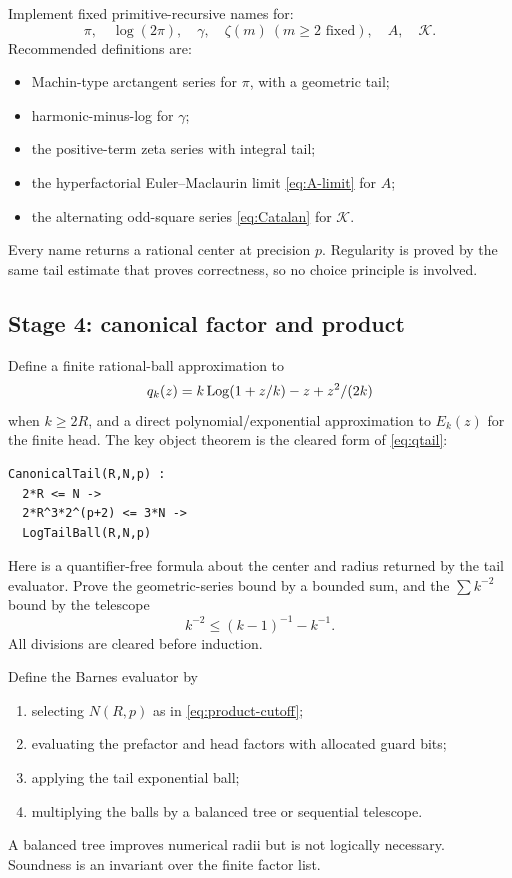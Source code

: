 Implement fixed primitive-recursive names for:
\[
 \pi,\quad \log(2\pi),\quad \gamma,\quad
 \zeta(m)\ (m\ge2\text{ fixed}),\quad
 A,\quad \mathcal K.
\]
Recommended definitions are:
\begin{itemize}
\item Machin-type arctangent series for \(\pi\), with a geometric tail;
\item harmonic-minus-log for \(\gamma\);
\item the positive-term zeta series with integral tail;
\item the hyperfactorial Euler--Maclaurin limit \cref{eq:A-limit} for \(A\);
\item the alternating odd-square series \cref{eq:Catalan} for \(\mathcal K\).
\end{itemize}
Every name returns a rational center at precision \(p\).  Regularity is proved
by the same tail estimate that proves correctness, so no choice principle is
involved.

\subsection{Stage 4: canonical factor and product}

Define a finite rational-ball approximation to
\[
 q_k(z)=k\operatorname{Log}(1+z/k)-z+z^2/(2k)
\]
when \(k\ge2R\), and a direct polynomial/exponential approximation to
\(E_k(z)\) for the finite head.  The key object theorem is the cleared form of
\cref{eq:qtail}:
\begin{lstlisting}[language={}]
CanonicalTail(R,N,p) :
  2*R <= N ->
  2*R^3*2^(p+2) <= 3*N ->
  LogTailBall(R,N,p)
\end{lstlisting}
Here  is a quantifier-free formula about the center and radius
returned by the tail evaluator.  Prove the geometric-series bound by a bounded
sum, and the \(\sum k^{-2}\) bound by the telescope
\[
 k^{-2}\le(k-1)^{-1}-k^{-1}.
\]
All divisions are cleared before induction.

Define the Barnes evaluator by
\begin{enumerate}
\item selecting \(N(R,p)\) as in \cref{eq:product-cutoff};
\item evaluating the prefactor and head factors with allocated guard bits;
\item applying the tail exponential ball;
\item multiplying the balls by a balanced tree or sequential telescope.
\end{enumerate}
A balanced tree improves numerical radii but is not logically necessary.
Soundness is an invariant over the finite factor list.

